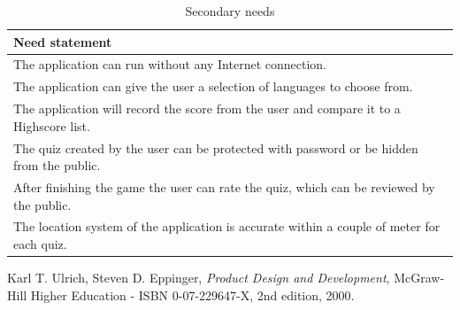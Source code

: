 \documentclass{TDP003mall}
\begin{document}
\begin{table}[htb]
\caption{Secondary needs}
\centering
\begin{tabular}{l}
\hline\hline
Need statement \\[0.5ex]
\hline
The application can run without any Internet connection. \\
The application can give the user a selection of languages to choose from. \\
The application will record the score from the user and compare it to a Highscore list. \\
The quiz created by the user can be protected with password or be hidden from the public. \\
After finishing the game the user can rate the quiz, which can be reviewed by the public. \\
The location system of the application is accurate within a couple of meter for each quiz. \\ [1ex]
\hline
\end{tabular}
\label{table:SecondaryNeeds}
\end{table}

\begin{thebibliography}{9}
  Karl T. Ulrich, Steven D. Eppinger,
  \textit{Product Design and Development},
  McGraw-Hill Higher Education - ISBN 0-07-229647-X,
  2nd edition,
  2000.
\end{thebibliography}
\end{document}
